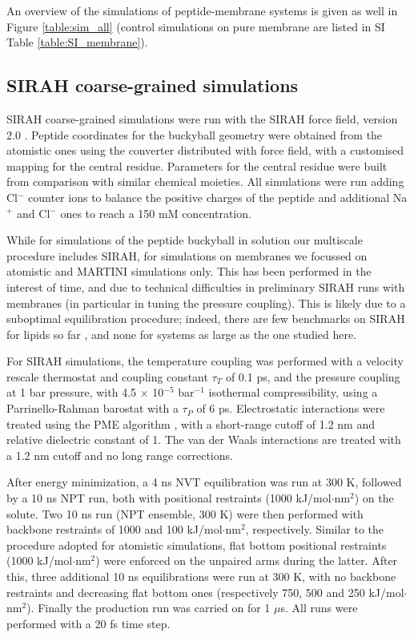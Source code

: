 An overview of the simulations of peptide-membrane systems is given as well in Figure \ref{table:sim_all} (control simulations on pure membrane are listed in SI Table \ref{table:SI_membrane}).

\subsection{SIRAH coarse-grained simulations}
SIRAH coarse-grained simulations were run with the SIRAH force field, version 2.0 \citep{Machado2018}. Peptide coordinates for the buckyball geometry were obtained from the atomistic ones using the converter distributed with force field, with a customised mapping for the central residue. Parameters for the central residue were built from comparison with similar chemical moieties. All simulations were run adding Cl$^-$ counter ions to balance the positive charges of the peptide and additional Na$^+$  and Cl$^-$ ones to reach a 150 mM concentration.

While for simulations of the peptide buckyball in solution our multiscale procedure includes SIRAH, for simulations on membranes we focussed on atomistic and MARTINI simulations only. This has been performed in the interest of time, and due to technical difficulties in preliminary SIRAH runs with membranes (in particular in tuning the pressure coupling).
%
This is likely due to a suboptimal equilibration procedure; indeed, there are few benchmarks on SIRAH for lipids so far \citep{Barrera2019}, and none for systems as large as the one studied here.

For SIRAH simulations, the temperature coupling was performed with a velocity rescale thermostat \citep{Bussi2007} and coupling constant $\tau _T$ of 0.1 ps, and the pressure coupling at 1 bar pressure, with 4.5 $\times$ 10$^{-5}$ bar$^{-1}$ isothermal compressibility, using a Parrinello-Rahman barostat \citep{Parrinello1981} with a $\tau _P$ of 6 ps. Electrostatic interactions were treated using the PME algorithm \citep{Essmann1995}, with a short-range cutoff of 1.2 nm and relative dielectric constant of 1. The van der Waals interactions are treated with a 1.2 nm cutoff and no long range corrections.

After energy minimization, a 4 ns NVT equilibration was run at 300 K, followed by a 10 ns NPT run, both with positional restraints (1000 kJ/mol$\cdot$nm$^2$) on the solute. Two 10 ns run (NPT ensemble, 300 K) were then performed with backbone restraints of 1000 and 100 kJ/mol$\cdot$nm$^2$, respectively. Similar to the procedure adopted for atomistic simulations, flat bottom positional restraints (1000 kJ/mol$\cdot$nm$^2$) were enforced on the unpaired arms during the latter. After this, three additional 10 ns equilibrations were run at 300 K, with no backbone restraints and decreasing flat bottom ones (respectively 750, 500 and 250 kJ/mol$\cdot$nm$^2$). Finally the production run was carried on for 1 $\mu$s. All runs were performed with a 20 fs time step.

